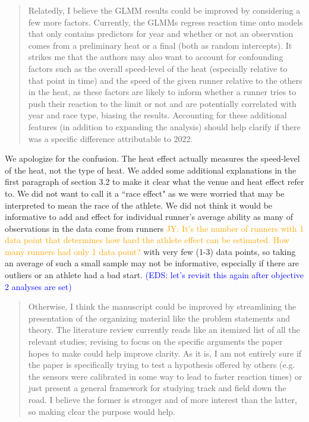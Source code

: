 \documentclass[12pt]{article}
\newcommand{\jy}[1]{\textcolor{orange}{JY: #1}}
\newcommand{\eds}[1]{\textcolor{blue}{(EDS: #1)}}
\newenvironment{comment}%
{\begin{quotation}\noindent\small\it\color{darkblue}\ignorespaces%
}{\end{quotation}}
\begin{document}
\begin{comment}
Relatedly, I believe the GLMM results could be improved by considering a few
more factors. Currently, the GLMMs regress reaction time onto models that only
contains predictors for year and whether or not an observation comes from a
preliminary heat or a final (both as random intercepts). It strikes me that the
authors may also want to account for confounding factors such as the overall
speed-level of the heat (especially relative to that point in time) and the
speed of the given runner relative to the others in the heat, as these factors
are likely to inform whether a runner tries to push their reaction to the limit
or not and are potentially correlated with year and race type, biasing the
results. Accounting for these additional features (in addition to expanding the
analysis) should help clarify if there was a specific difference attributable to
2022.
\end{comment} 


We apologize for the confusion. The heat effect actually measures the speed-level 
of the heat, not the type of heat.  We added some additional
explanations in the first paragraph of section 3.2 to make it clear what the
venue and heat effect refer to. We did not want to call it a ``race effect" as we
were worried that may be interpreted to mean the race of the athlete.  We did
not think it would be informative to  add and effect for individual runner's
average ability as many of observations in the data come from runners
\jy{It's the number of runners with 1 data point that determines how
  hard the athlete effect can be estimated. How many runners had only 1
  data point?}
with very few (1-3) data points, so taking an average of such a small sample may
not be informative, especially if there are outliers or an athlete had a bad
start.
\eds{let's revisit this again after objective 2 analyses are set}


\begin{comment}
Otherwise, I think the manuscript could be improved by streamlining the
presentation of the organizing material like the problem statements and theory.
The literature review currently reads like an itemized list of all the relevant
studies; revising to focus on the specific arguments the paper hopes to make
could help improve clarity. As it is, I am not entirely sure if the paper is
specifically trying to test a hypothesis offered by others (e.g. the sensors
were calibrated in some way to lead to faster reaction times) or just present a
general framework for studying track and field down the road. I believe the
former is stronger and of more interest than the latter, so making clear the
purpose would help.
\end{comment}  
\end{document}
